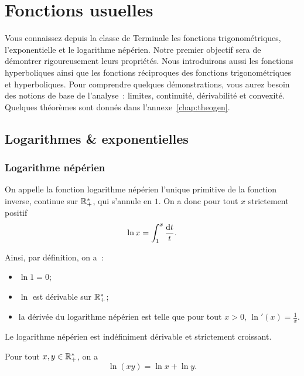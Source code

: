 \chapter{Fonctions usuelles}\label{chap:fonctionsusuelles}
\minitoc%
\minilof%
\minilot%

Vous connaissez depuis la classe de Terminale les fonctions trigonométriques,
l'exponentielle et le logarithme népérien. Notre premier objectif sera de
démontrer rigoureusement leurs propriétés. Nous introduirons aussi les fonctions
hyperboliques ainsi que les fonctions réciproques des fonctions trigonométriques
et hyperboliques. Pour comprendre quelques démonstrations, vous aurez besoin des
notions de base de l'analyse~: limites, continuité, dérivabilité et convexité.
Quelques théorèmes sont donnés dans l'annexe~\ref{chap:theogen}.

\section{Logarithmes \& exponentielles}\label{sec:chap1-logetexp}
\subsection{Logarithme népérien}\label{subsec:chap1-lognep}
\begin{defdef}\label{def:chap1-deflognep}
  On appelle la fonction logarithme népérien l'unique primitive de la fonction
  inverse, continue sur \(\mathbb{R}_{+}^{*}\), qui s'annule en \(1\). On a donc pour
  tout \(x\) strictement positif
  \begin{equation}
    \ln{x} = \int_{1}^{x} \frac{\mathop{}\mathopen{}\mathrm{d}{}t}{t}.
  \end{equation}
\end{defdef}

Ainsi, par définition, on a~:
\begin{itemize}
  \item \(\ln 1 = 0\);
  \item \(\ln\) est dérivable sur \(\mathbb{R}_{+}^{*}\);
  \item la dérivée du logarithme népérien est telle que pour tout \(x>0\),
    \(\ln'(x) = \frac{1}{x}\).
\end{itemize}

Le logarithme népérien est indéfiniment dérivable et strictement croissant.

\begin{theo}\label{theo:lognep1}
  Pour tout \(x, y \in \mathbb{R}_{+}^{*}\), on a
  \begin{equation}
    \ln(x y) = \ln{x} + \ln{y}.
  \end{equation}
\end{theo}

